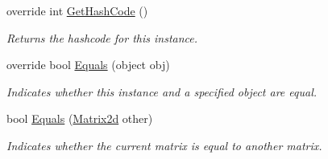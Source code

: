 \begin{DoxyCompactItemize}
override int \hyperlink{struct_open_t_k_1_1_matrix2d_a45e220e92b184901927a728fb40db353}{Get\-Hash\-Code} ()
\begin{DoxyCompactList}\small\item\em Returns the hashcode for this instance. \end{DoxyCompactList}\item 
override bool \hyperlink{struct_open_t_k_1_1_matrix2d_aeaab31fd628a2125e30f3b55c238a361}{Equals} (object obj)
\begin{DoxyCompactList}\small\item\em Indicates whether this instance and a specified object are equal. \end{DoxyCompactList}\item 
bool \hyperlink{struct_open_t_k_1_1_matrix2d_a976159adfa705034bd05da247d7d22fc}{Equals} (\hyperlink{struct_open_t_k_1_1_matrix2d}{Matrix2d} other)
\begin{DoxyCompactList}\small\item\em Indicates whether the current matrix is equal to another matrix.\end{DoxyCompactList}\end{DoxyCompactItemize}
